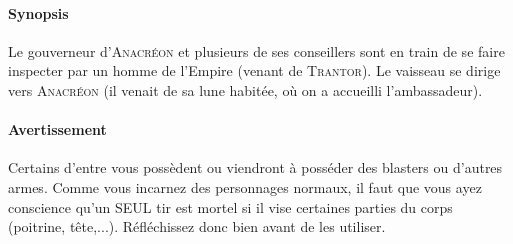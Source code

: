 \documentclass{article}
\begin{document}
\paragraph{Synopsis}
{
Le gouverneur d’\textsc{Anacréon} et plusieurs de ses conseillers sont en train de se faire inspecter par un homme de l’Empire (venant de \textsc{Trantor}).
Le vaisseau se dirige vers \textsc{Anacréon} (il venait de sa lune habitée, où on a accueilli l'ambassadeur).
}

\paragraph{Avertissement}
{
Certains d'entre vous possèdent ou viendront à posséder des blasters ou d'autres armes. Comme vous incarnez des personnages normaux, il faut que vous ayez conscience qu'un SEUL tir est mortel si il vise certaines parties du corps (poitrine, tête,...). Réfléchissez donc bien avant de les utiliser.
}



\newpage
\end{document}
